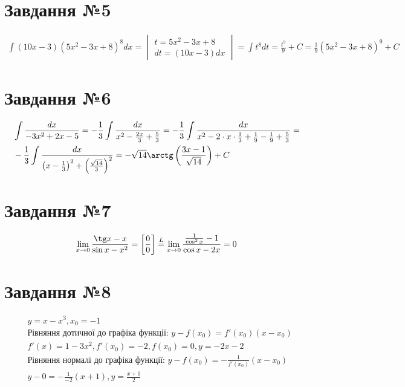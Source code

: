 \documentclass{report}
\begin{document}
\section{Завдання №5}
\begin{equation}\label{eq5}\begin{split}
	 \int (10x - 3)(5x^2 - 3x + 8)^8 dx = \begin{vmatrix}t = 5x^2 - 3x + 8\\dt = (10x - 3)dx\end{vmatrix} = \int t^8 dt = \frac{t^9}{9} + C = \frac{1}{9}(5x^2 - 3x + 8)^9 + C
\end{split}\end{equation}

\section{Завдання №6}
\begin{equation}\label{eq6}\begin{split}
	& \int \frac{dx}{-3x^2 + 2x - 5} = -\frac{1}{3}\int\frac{dx}{x^2 -\frac{2x}{3} + \frac{5}{3}} = -\frac{1}{3}\int\frac{dx}{x^2 - 2 \cdot x \cdot \frac{1}{3} + \frac{1}{9} - \frac{1}{9} + \frac{5}{3}} =\\
	& -\frac{1}{3}\int\frac{dx}{\left(x - \frac{1}{3}\right)^2 + \left(\frac{\sqrt{14}}{3}\right)^2} = -\sqrt{14}\arctg\left(\frac{3x-1}{\sqrt{14}}\right) + C
\end{split}
\end{equation}

\section{Завдання №7}
\begin{equation}\label{eq7}
	\lim_{x \to 0} \frac{\tg x - x}{\sin x - x^{2}} = \left[\frac{0}{0}\right] \overset{L}{=} \lim_{x \to 0} \frac{\frac{1}{\cos^{2}x} - 1}{\cos x - 2x} = 0
\end{equation}

\section{Завдання №8}
\begin{equation}\label{eq8}\begin{split}
	&y = x - x^{3}, x_0 = -1\\
	&\mbox{Рівняння дотичної до графіка функції: } y - f(x_0) = f'(x_0)(x - x_0)\\
	& f'(x) = 1 - 3x^{2}, f'(x_0) = -2, f(x_0) = 0, y =  -2x - 2\\
	&\mbox{Рівняння нормалі до графіка функції: } y - f(x_0) = -\frac{1}{f'(x_0)}(x - x_0)\\
	& y - 0 = -\frac{1}{-2}(x + 1), y = \frac{x + 1}{2}
\end{split}
\end{equation}
\end{document}
